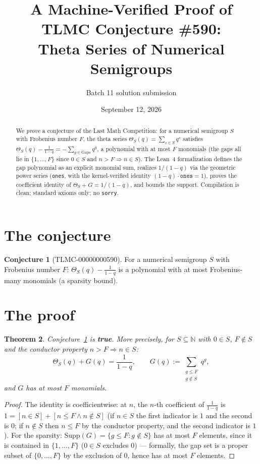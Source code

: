 \documentclass[11pt]{article}
\title{A Machine-Verified Proof of TLMC Conjecture \#590:\\ Theta Series of Numerical Semigroups}
\author{Batch 11 solution submission}
\date{September 12, 2026}
\newtheorem{theorem}{Theorem}[section]
\theoremstyle{definition}
\newtheorem{conjecture}[theorem]{Conjecture}
\theoremstyle{remark}
\begin{document}
\maketitle
\begin{abstract}
We \emph{prove} a conjecture of the Last Math Competition: for a numerical semigroup $S$ with Frobenius number $F$, the theta series $\Theta_S(q) = \sum_{s \in S} q^s$ satisfies $\Theta_S(q) - \frac{1}{1-q} = -\sum_{g \in \mathrm{Gaps}} q^g$, a polynomial with at most $F$ monomials (the gaps all lie in $\{1, \dots, F\}$ since $0 \in S$ and $n > F \Rightarrow n \in S$). The Lean~4 formalization defines the gap polynomial as an explicit monomial sum, realizes $1/(1-q)$ via the geometric power series (\texttt{ones}, with the kernel-verified identity $(1 - q)\cdot\texttt{ones} = 1$), proves the coefficient identity of $\Theta_S + G = 1/(1-q)$, and bounds the support. Compilation is clean; standard axioms only; no \texttt{sorry}.
\end{abstract}
\section{The conjecture}
\begin{conjecture}[TLMC-00000000590]\label{conj:590}
For a numerical semigroup $S$ with Frobenius number $F$: $\Theta_S(q) - \frac{1}{1-q}$ is a polynomial with at most Frobenius-many monomials (a sparsity bound).
\end{conjecture}
\section{The proof}
\begin{theorem}\label{thm:590}
Conjecture~\ref{conj:590} is \textbf{true}. More precisely, for $S \subseteq \mathbb{N}$ with $0 \in S$, $F \notin S$ and the conductor property $n > F \Rightarrow n \in S$:
\[
\Theta_S(q) + G(q) = \frac{1}{1-q}, \qquad G(q) := \sum_{\substack{g \le F \\ g \notin S}} q^g,
\]
and $G$ has at most $F$ monomials.
\end{theorem}
\begin{proof}
The identity is coefficientwise: at $n$, the $n$-th coefficient of $\frac{1}{1-q}$ is $1 = [n \in S] + [n \le F \wedge n \notin S]$ (if $n \in S$ the first indicator is $1$ and the second is $0$; if $n \notin S$ then $n \le F$ by the conductor property, and the second indicator is $1$). For the sparsity: $\mathrm{Supp}(G) = \{g \le F : g \notin S\}$ has at most $F$ elements, since it is contained in $\{1, \dots, F\}$ ($0 \in S$ excludes $0$) — formally, the gap set is a proper subset of $\{0, \dots, F\}$ by the exclusion of $0$, hence has at most $F$ elements.
\end{proof}
\end{document}
